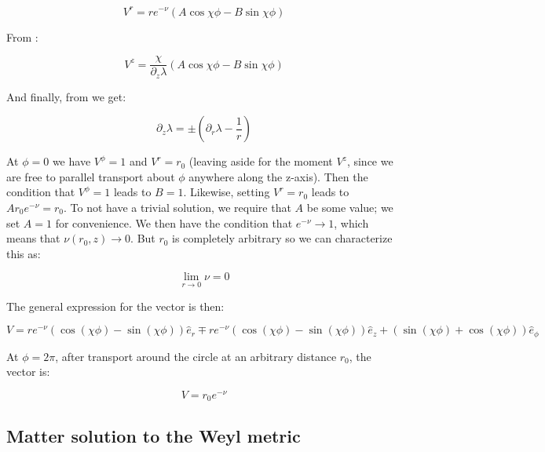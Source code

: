 \documentclass{article}
\begin{document}
\begin{equation}
V^{r}=re^{-\nu}\left(A\cos\chi\phi-B\sin\chi\phi\right)
\end{equation}

From :

\begin{equation}
V^{z}=\frac{\chi}{\partial_{z}\lambda}\left(A\cos\chi\phi-B\sin\chi\phi\right)
\end{equation}

And finally, from  we get:

\begin{equation}
  \label{eq:partial_z-partial_r}
  \partial_z\lambda = \pm\left(\partial_r\lambda-\frac{1}{r}\right)
\end{equation}

At $\phi=0$ we have $V^\phi=1$ and $V^r=r_0$ (leaving aside for the
moment $V^z$, since we are free to parallel transport about $\phi$
anywhere along the z-axis). Then the condition that $V^\phi=1$ leads to
$B=1$. Likewise, setting $V^r=r_0$ leads to $Ar_0e^{-\nu}=r_0$. To not
have a trivial solution, we require that $A$ be some value; we set
$A=1$ for convenience. We then have the condition that
$e^{-\nu}\rightarrow 1$, which means that $\nu(r_0,z)\rightarrow
0$. But $r_0$ is completely arbitrary so we can characterize this as:

\begin{equation}
  \label{eq:nu-elem-flat}
  \lim_{r\rightarrow 0}\nu=0
\end{equation}

The general expression for the vector is then:

\begin{equation}
\label{eq:v-par-transport}
V=re^{-\nu}\left(\cos(\chi\phi)-\sin(\chi\phi)\right)\hat{e}_{r}\mp re^{-\nu}\left(\cos(\chi\phi)-\sin(\chi\phi)\right)\hat{e}_{z}+\left(\sin(\chi\phi)+\cos(\chi\phi)\right)\hat{e}_{\phi}
\end{equation}

At $\phi=2\pi$, after transport around the circle at an arbitrary
distance $r_0$, the vector is:

\begin{equation}
  \label{eq:v-par-transport-2pi}
  V=r_0 e^{-\nu}
\end{equation}


\subsection{Matter solution to the Weyl metric}
\end{document}
